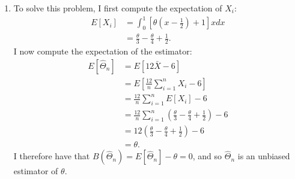\begin{problem}{3}$ $
\begin{enumerate}
\item To solve this problem, I first compute the expectation of $X_i$:
\begin{align*}
E[X_i] &= \int_0^1\left[ \theta \left (x-\frac{1}{2} \right)+1\right]x dx \\
& = \frac{\theta}{3}- \frac{\theta}{4}+\frac{1}{2}.
\end{align*}
I now compute the expectation of the estimator:
\begin{align*}
E[\hat \Theta_n] &= E[12 \bar X - 6] \\ 
&= E\left[\frac{12}{n}\sum_{i=1}^n X_i - 6 \right] \\ 
&= \frac{12}{n}\sum_{i=1}^n E[X_i] - 6  \\ 
&= \frac{12}{n}\sum_{i=1}^n \left(\frac{\theta}{3}- \frac{\theta}{4}+\frac{1}{2}\right) - 6  \\ 
&= 12 \left(\frac{\theta}{3}- \frac{\theta}{4}+\frac{1}{2}\right) - 6  \\ 
& = \theta.
\end{align*}
I therefore have that $B(\hat \Theta_n) = E[\hat \Theta_n] -\theta = 0$, and so $\hat \Theta_n$ is an unbiased estimator of $\theta$.



\end{enumerate}
\end{problem}

